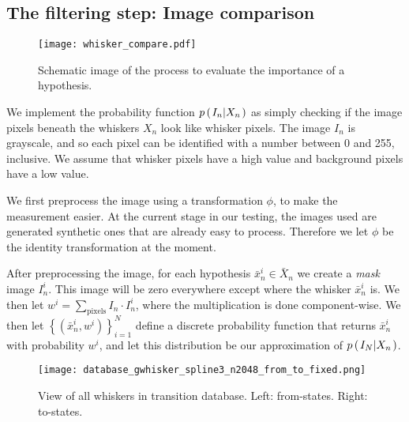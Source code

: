 \subsection*{The filtering step: Image comparison}

\begin{figure}
  \centering
  \texttt{[image: whisker\_compare.pdf]}
  \caption{Schematic image of the process to evaluate the importance of a hypothesis.}
  \label{fig:whisker_compare}
\end{figure}

We implement the probability function $p\left(\left. I_n \middle\vert X_n \right.\right)$ as simply checking if the image pixels beneath the whiskers $X_n$ look like whisker pixels. The image $I_n$ is grayscale, and so each pixel can be identified with a number between 0 and 255, inclusive. We assume that whisker pixels have a high value and background pixels have a low value.

We first preprocess the image using a transformation $\phi$, to make the measurement easier. At the current stage in our testing, the images used are generated synthetic ones that are already easy to process. Therefore we let $\phi$ be the identity transformation at the moment.

After preprocessing the image, for each hypothesis $\bar{x}_n^i \in \bar{X}_n$ we create a \emph{mask} image $I_n^i$. This image will be zero everywhere except where the whisker $\bar{x}_n^i$ is. We then let $w^i = \sum\limits_{\mathrm{pixels}}I_n \cdot I_n^i$, where the multiplication is done component-wise. We then let $\left\{\left(\bar{x}_n^i, w^i\right)\right\}_{i=1}^N$ define a discrete probability function that returns $\bar{x}_n^i$ with probability $w^i$, and let this distribution be our approximation of $p\left(\left. I_N \middle\vert X_n \right.\right)$.

\begin{figure}
  \centering
  \texttt{[image: database\_gwhisker\_spline3\_n2048\_from\_to\_fixed.png]}
  \caption{View of all whiskers in transition database. Left: from-states. Right: to-states.}
  \label{fig:database}
\end{figure}
